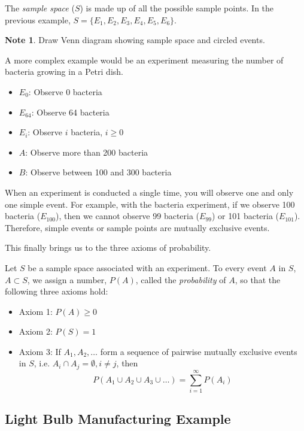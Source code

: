 \documentclass[11pt]{article}
\theoremstyle{definition}
\newtheorem{note}{Note}
\begin{document}
The \textit{sample space} ($S$) is made up of all the possible sample points. In the previous example, $S = \{E_1, E_2, E_3, E_4, E_5, E_6\}$.

\begin{note}
	Draw Venn diagram showing sample space and circled events.
\end{note}

A more complex example would be an experiment measuring the number of bacteria growing in a Petri dish.

\begin{itemize}[label={}]
	\setlength\itemsep{0em}
	\item $E_0$: Observe 0 bacteria
	\item $E_{64}$: Observe 64 bacteria
	\item $E_i$: Observe $i$ bacteria, $i \geq 0$
	\item $A$: Observe more than 200 bacteria
	\item $B$: Observe between 100 and 300 bacteria
\end{itemize}

When an experiment is conducted a single time, you will observe one and only one simple event. For example, with the bacteria experiment, if we observe 100 bacteria ($E_{100}$), then we cannot observe 99 bacteria ($E_{99}$) or 101 bacteria ($E_{101}$). Therefore, simple events or sample points are mutually exclusive events.

This finally brings us to the three axioms of probability.

\begin{shaded}
	Let $S$ be a sample space associated with an experiment. To every event $A$ in $S$, $A \subset S$, we assign a number, $P(A)$, called the \textit{probability} of $A$, so that the following three axioms hold:
	\begin{itemize}[label={}]
		\setlength\itemsep{0em}
		\item Axiom 1: $P(A) \geq 0$
		\item Axiom 2: $P(S) = 1$
		\item Axiom 3: If $A_1, A_2, \ldots$ form a sequence of pairwise mutually exclusive events in $S$, i.e. $A_i \cap A_j = \emptyset, i \neq j$, then
		$$
			P(A_1 \cup A_2 \cup A_3 \cup \ldots) = \sum_{i=1}^\infty P(A_i)
		$$
	\end{itemize}
\end{shaded}

\subsection{Light Bulb Manufacturing Example}
\end{document}
